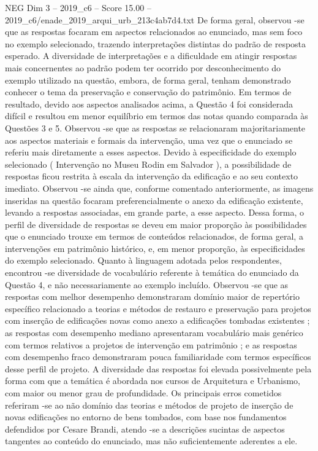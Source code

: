 \begin{textsample}{NEG Dim 3 – 2019\_c6 – Score 15.00 – 2019\_c6/enade\_2019\_arqui\_urb\_213c4ab7d4.txt}
De forma geral, observou -se que as respostas focaram em aspectos relacionados ao enunciado, mas sem foco no exemplo selecionado, trazendo interpretações distintas do padrão de resposta esperado.
A diversidade de interpretações e a dificuldade em atingir respostas mais concernentes ao padrão podem ter ocorrido por desconhecimento do exemplo utilizado na questão, embora, de forma geral, tenham demonstrado conhecer o tema da preservação e conservação do patrimônio.
Em termos de resultado, devido aos aspectos analisados acima, a Questão 4 foi considerada difícil e resultou em menor equilíbrio em termos das notas quando comparada às Questões 3 e 5.
Observou -se que as respostas se relacionaram majoritariamente aos aspectos materiais e formais da intervenção, uma vez que o enunciado se referiu mais diretamente a esses aspectos.
Devido à especificidade do exemplo selecionado ( Intervenção no Museu Rodin em Salvador ), a possibilidade de respostas ficou restrita à escala da intervenção da edificação e ao seu contexto imediato.
Observou -se ainda que, conforme comentado anteriormente, as imagens inseridas na questão focaram preferencialmente o anexo da edificação existente, levando a respostas associadas, em grande parte, a esse aspecto.
Dessa forma, o perfil de diversidade de respostas se deveu em maior proporção às possibilidades que o enunciado trouxe em termos de conteúdos relacionados, de forma geral, a intervenções em patrimônio histórico, e, em menor proporção, às especificidades do exemplo selecionado.
Quanto à linguagem adotada pelos respondentes, encontrou -se diversidade de vocabulário referente à temática do enunciado da Questão 4, e não necessariamente ao exemplo incluído.
Observou -se que as respostas com melhor desempenho demonstraram domínio maior de repertório específico relacionado a teorias e métodos de restauro e preservação para projetos com inserção de edificações novas como anexo a edificações tombadas existentes ; as respostas com desempenho mediano apresentaram vocabulário mais genérico com termos relativos a projetos de intervenção em patrimônio ; e as respostas com desempenho fraco demonstraram pouca familiaridade com termos específicos desse perfil de projeto.
A diversidade das respostas foi elevada possivelmente pela forma com que a temática é abordada nos cursos de Arquitetura e Urbanismo, com maior ou menor grau de profundidade.
Os principais erros cometidos referiram -se ao não domínio das teorias e métodos de projeto de inserção de novas edificações no entorno de bens tombados, com base nos fundamentos defendidos por Cesare Brandi, atendo -se a descrições sucintas de aspectos tangentes ao conteúdo do enunciado, mas não suficientemente aderentes a ele.

\end{textsample}

